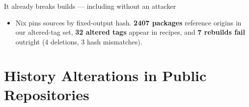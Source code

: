 \documentclass[aspectratio=169]{beamer}
\newcommand{\NixPkgsTracked}{\num{2407}\xspace}
\newcommand{\NixPkgsAffected}{\num{32}\xspace}
\newcommand{\NixPkgsHashMismatch}{\num{7}\xspace}
\newcommand{\NixPkgsFailDeletion}{\num{4}\xspace}
\newcommand{\NixPkgsFailHashMismatch}{\num{3}\xspace}
\newcommand{\AttackRepoFork}{\texttt{zendesk/changed-files}\xspace}
\newcommand{\AttackTagMovesCount}{\num{346}\xspace}
\begin{document}
\begin{frame}[fragile]{It already breaks builds --- including without an attacker}
    \begingroup\small
    \begin{itemize}\setlength{\itemsep}{0.35em}
        \item Nix pins sources by fixed-output hash.
              \textbf{\NixPkgsTracked{} packages} reference origins in our altered-tag set,
              \textbf{\NixPkgsAffected{} altered tags} appear in recipes, and
              \textbf{\NixPkgsHashMismatch{} rebuilds fail} outright
              (\NixPkgsFailDeletion{} deletions, \NixPkgsFailHashMismatch{} hash
              mismatches).
    \end{itemize}
    \endgroup
    \vspace{0.2em}
\end{frame}


\section{History Alterations in Public Repositories}
\end{document}
